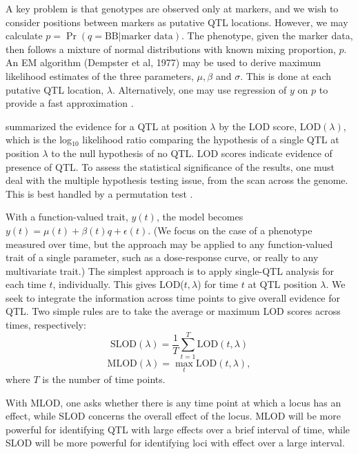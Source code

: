 \documentclass[12pt,letterpaper]{article}
\begin{document}
A key problem is that genotypes are observed only at markers, and we
wish to consider positions between markers as putative QTL
locations. However, we may calculate $p = \Pr(q=\text{BB} | \text{marker data})$.
The phenotype, given the marker data, then follows a mixture
of normal distributions with known mixing proportion, $p$. An EM algorithm
(Dempster et al, 1977) may be used to derive maximum likelihood
estimates of the three parameters, $\mu, \beta$ and $\sigma$. This is
done at each putative QTL location, $\lambda$. Alternatively, one may
use regression of $y$ on $p$ to provide a fast approximation \citep{Haley1992}.

\citet{Lander1989} summarized the evidence for a QTL at
position $\lambda$ by the LOD score, LOD$(\lambda)$, which is the log$_{10}$
likelihood ratio comparing the hypothesis of a single QTL at
position $\lambda$ to the null hypothesis of no QTL.
LOD scores indicate evidence of presence of QTL. To assess the
statistical significance of the results, one must deal with the
multiple hypothesis testing issue, from the scan across the
genome. This is best handled by a permutation test \citep{Churchill1994}.

With a function-valued trait, $y(t)$, the model becomes
$y(t) = \mu(t) + \beta(t) q + \epsilon(t)$.
(We focus on the case of a phenotype measured over time, but the
approach may be applied to any function-valued trait of a single
parameter, such as a dose-response curve, or really to any
multivariate trait.)
The simplest approach is to apply single-QTL analysis for each time
$t$, individually. This gives LOD($t, \lambda$) for time $t$ at QTL position
$\lambda$. We seek to integrate the information across time points to give
overall evidence for QTL. Two simple rules are to take the average or maximum LOD
scores across times, respectively:
\begin{equation*}
  \text{SLOD}(\lambda) = \frac{1}{T} \sum_{t=1}^{T} \text{LOD}(t,\lambda)
\end{equation*}
\begin{equation*}
  \text{MLOD}(\lambda) = \max_t \text{LOD}(t,\lambda),
\end{equation*}
where $T$ is the number of time points.

With MLOD, one asks whether there is any time point at which a locus
has an effect, while SLOD concerns the overall effect of the
locus. MLOD will be more powerful for identifying QTL with large
effects over a brief interval of time, while SLOD will be more
powerful for identifying loci with effect over a large interval.
\end{document}
